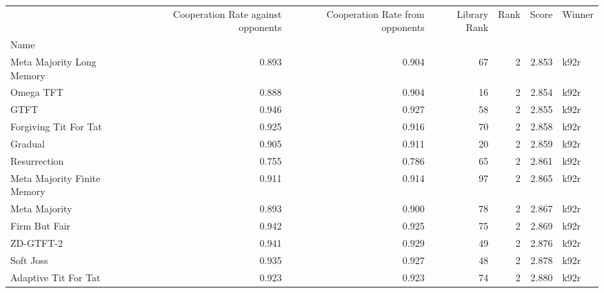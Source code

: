 \begin{tabular}{lrrrrrl}
\toprule
{} &  Cooperation Rate against opponents &  Cooperation Rate from opponents &  Library Rank &  Rank &  Score & Winner \\
Name                        &                                     &                                  &               &       &        &        \\
\midrule
Meta Majority Long Memory   &                               0.893 &                            0.904 &            67 &     2 &  2.853 &   k92r \\
Omega TFT                   &                               0.888 &                            0.904 &            16 &     2 &  2.854 &   k92r \\
GTFT                        &                               0.946 &                            0.927 &            58 &     2 &  2.855 &   k92r \\
Forgiving Tit For Tat       &                               0.925 &                            0.916 &            70 &     2 &  2.858 &   k92r \\
Gradual                     &                               0.905 &                            0.911 &            20 &     2 &  2.859 &   k92r \\
Resurrection                &                               0.755 &                            0.786 &            65 &     2 &  2.861 &   k92r \\
Meta Majority Finite Memory &                               0.911 &                            0.914 &            97 &     2 &  2.865 &   k92r \\
Meta Majority               &                               0.893 &                            0.900 &            78 &     2 &  2.867 &   k92r \\
Firm But Fair               &                               0.942 &                            0.925 &            75 &     2 &  2.869 &   k92r \\
ZD-GTFT-2                   &                               0.941 &                            0.929 &            49 &     2 &  2.876 &   k92r \\
Soft Joss                   &                               0.935 &                            0.927 &            48 &     2 &  2.878 &   k92r \\
Adaptive Tit For Tat        &                               0.923 &                            0.923 &            74 &     2 &  2.880 &   k92r \\

\end{tabular}
